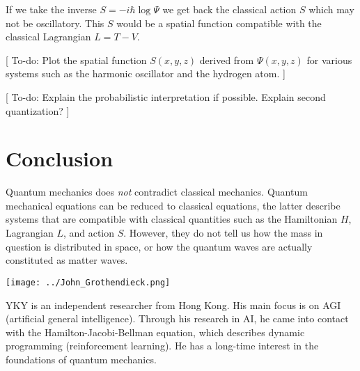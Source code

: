 If we take the inverse $S = - i \hbar \log \Psi$ we get back the classical action $S$ which may not be oscillatory.  This $S$ would be a spatial function compatible with the classical Lagrangian $L = T - V$.  

[ To-do: Plot the spatial function $S(x, y, z)$ derived from $\Psi(x, y, z)$ for various systems such as the harmonic oscillator and the hydrogen atom. ]

[ To-do: Explain the probabilistic interpretation if possible.  Explain second quantization? ]

\section{Conclusion}

Quantum mechanics does \textit{not} contradict classical mechanics.  Quantum mechanical equations can be reduced to classical equations, the latter describe systems that are compatible with classical quantities such as the Hamiltonian $H$, Lagrangian $L$, and action $S$.  However, they do not tell us how the mass in question is distributed in space, or how the quantum waves are actually constituted as matter waves.

\begin{minipage}{0.15\textwidth}
	\begin{center}
		\texttt{[image: ../John\_Grothendieck.png]}
	\end{center}
\end{minipage}
\begin{minipage}{0.6\textwidth}
YKY is an independent researcher from Hong Kong.  His main focus is on AGI (artificial general intelligence).  Through his research in AI, he came into contact with the Hamilton-Jacobi-Bellman equation, which describes dynamic programming (reinforcement learning).  He has a long-time interest in the foundations of quantum mechanics.
\end{minipage}%

\nocite{Faria2010}
\nocite{Mann2018}
\nocite{Baaquie2014}
\nocite{Gustafson2003}
\nocite{Esposito2004}
\nocite{Cook1989}
\nocite{Gosson2017}
\nocite{Liberzon2012}
\nocite{Mueller-Kirsten2006}
\nocite{Merzbacher1998}
\nocite{Hameka2004}

\printbibliography

